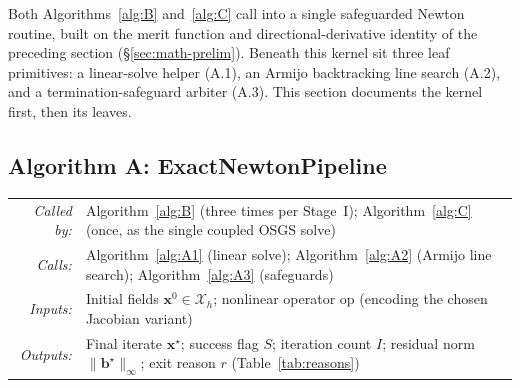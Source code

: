 \documentclass{article}
\makeatletter
\newcommand{\moduleinterface}[4]{%
\begin{interfacecard}
\footnotesize
\begin{tabular}{@{}r@{\quad}p{0.82\textwidth}@{}}
\textit{Called by:} & #1 \\
\textit{Calls:}     & #2 \\
\textit{Inputs:}    & #3 \\
\textit{Outputs:}   & #4 \\
\end{tabular}
\end{interfacecard}
}
\makeatother
\begin{document}
Both Algorithms~\ref{alg:B} and~\ref{alg:C} call into a single
safeguarded Newton routine, built on the merit function and
directional-derivative identity of the preceding section
(§\ref{sec:math-prelim}). Beneath this kernel sit three leaf
primitives: a linear-solve helper (A.1), an Armijo backtracking line
search (A.2), and a termination-safeguard arbiter (A.3). This section
documents the kernel first, then its leaves.

\subsection{Algorithm A: ExactNewtonPipeline}

\moduleinterface
    {Algorithm~\ref{alg:B} (three times per Stage~I); Algorithm~\ref{alg:C} (once, as the single coupled OSGS solve)}
    {Algorithm~\ref{alg:A1} (linear solve); Algorithm~\ref{alg:A2} (Armijo line search); Algorithm~\ref{alg:A3} (safeguards)}
    {Initial fields $\boldsymbol{x}^0 \in \mathcal{X}_h$; nonlinear operator $\mathrm{op}$ (encoding the chosen Jacobian variant)}
    {Final iterate $\boldsymbol{x}^\star$; success flag $S$; iteration count $I$; residual norm $\|\boldsymbol{b}^\star\|_\infty$; exit reason $r$ (Table~\ref{tab:reasons})}
\end{document}
